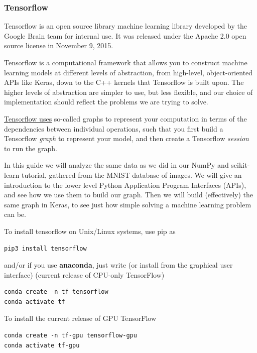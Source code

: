 \documentclass{beamer}
\begin{document}
\begin{frame}
\frametitle{Tensorflow}

Tensorflow is an open source library machine learning library
developed by the Google Brain team for internal use. It was released
under the Apache 2.0 open source license in November 9, 2015.

Tensorflow is a computational framework that allows you to construct
machine learning models at different levels of abstraction, from
high-level, object-oriented APIs like Keras, down to the C++ kernels
that Tensorflow is built upon. The higher levels of abstraction are
simpler to use, but less flexible, and our choice of implementation
should reflect the problems we are trying to solve.

\href{{https://www.tensorflow.org/guide/graphs}}{Tensorflow uses} so-called graphs to represent your computation
in terms of the dependencies between individual operations, such that you first build a Tensorflow \emph{graph}
to represent your model, and then create a Tensorflow \emph{session} to run the graph.

In this guide we will analyze the same data as we did in our NumPy and
scikit-learn tutorial, gathered from the MNIST database of images. We
will give an introduction to the lower level Python Application
Program Interfaces (APIs), and see how we use them to build our graph.
Then we will build (effectively) the same graph in Keras, to see just
how simple solving a machine learning problem can be.

To install tensorflow on Unix/Linux systems, use pip as


\begin{verbatim}
pip3 install tensorflow

\end{verbatim}

and/or if you use \textbf{anaconda}, just write (or install from the graphical user interface)
(current release of CPU-only TensorFlow)



\begin{verbatim}
conda create -n tf tensorflow
conda activate tf

\end{verbatim}

To install the current release of GPU TensorFlow



\begin{verbatim}
conda create -n tf-gpu tensorflow-gpu
conda activate tf-gpu

\end{verbatim}
\end{frame}
\end{document}
